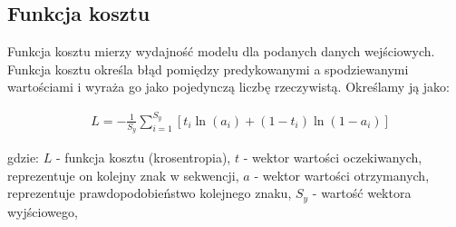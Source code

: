 \subsection{Funkcja kosztu}
Funkcja kosztu mierzy wydajność modelu dla podanych danych wejściowych.
Funkcja kosztu określa błąd pomiędzy predykowanymi a spodziewanymi wartościami i wyraża go jako pojedynczą 
liczbę rzeczywistą. 
Określamy ją jako:

\begin{align*}
  &L = - \frac{1}{S_y}\sum_{i=1}^{S_y}[t_i\ln(a_i) + (1-t_i)\ln(1-a_i)]
\end{align*}

gdzie: \newline
$L$ - funkcja kosztu (krosentropia), \newline
$t$ - wektor wartości oczekiwanych, reprezentuje on kolejny znak w sekwencji, \newline
$a$ - wektor wartości otrzymanych, reprezentuje prawdopodobieństwo kolejnego znaku,  \newline
$S_y$ - wartość wektora wyjściowego, \newline
